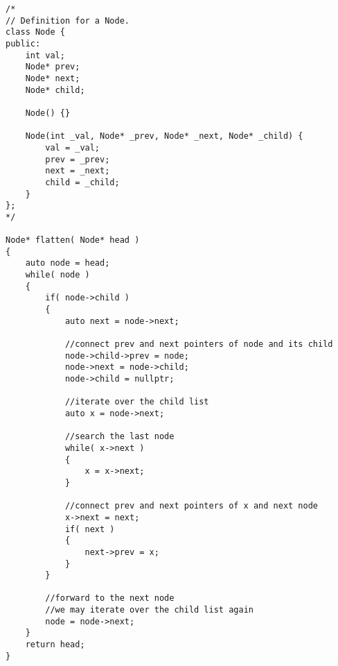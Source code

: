 \setcounter{lstlisting}{0}
\begin{lstlisting}[style=customc, caption={Flatten one list at a time}]
/*
// Definition for a Node.
class Node {
public:
    int val;
    Node* prev;
    Node* next;
    Node* child;

    Node() {}

    Node(int _val, Node* _prev, Node* _next, Node* _child) {
        val = _val;
        prev = _prev;
        next = _next;
        child = _child;
    }
};
*/

Node* flatten( Node* head )
{
    auto node = head;
    while( node )
    {
        if( node->child )
        {
            auto next = node->next;

            //connect prev and next pointers of node and its child
            node->child->prev = node;
            node->next = node->child;
            node->child = nullptr;

            //iterate over the child list
            auto x = node->next;

            //search the last node
            while( x->next )
            {
                x = x->next;
            }

            //connect prev and next pointers of x and next node
            x->next = next;
            if( next )
            {
                next->prev = x;
            }
        }

        //forward to the next node
        //we may iterate over the child list again
        node = node->next;
    }
    return head;
}
\end{lstlisting}